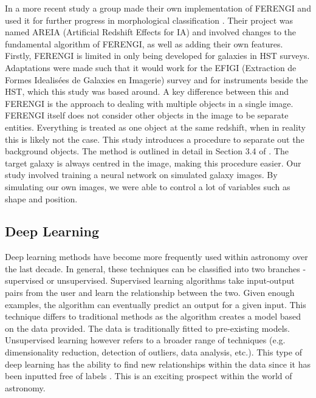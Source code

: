 \documentclass[fleqn,usenatbib]{mnras}
\begin{document}
In a more recent study a group made their own implementation of FERENGI and used it for further progress in morphological classification \citep{Ferreira2018}. Their project was named AREIA (Artificial Redshift Effects for IA) and involved changes to the fundamental algorithm of FERENGI, as well as adding their own features. Firstly, FERENGI is limited in only being developed for galaxies in HST surveys. Adaptations were made such that it would work for the EFIGI (Extraction de Formes Idealis\'ees de Galaxies en Imagerie) survey and for instruments beside the HST, which this study was based around. A key difference between this and FERENGI is the approach to dealing with multiple objects in a single image. FERENGI itself does not consider other objects in the image to be separate entities. Everything is treated as one object at the same redshift, when in reality this is likely not the case. This study introduces a procedure to separate out the background objects. The method is outlined in detail in Section 3.4 of \citet{Ferreira2018}. The target galaxy is always centred in the image, making this procedure easier.
Our study involved training a neural network on simulated galaxy images. By simulating our own images, we were able to control a lot of variables such as shape and position. 

\subsection{Deep Learning}
\label{sec:deep_learning}

Deep learning methods have become more frequently used within astronomy over the last decade. In general, these techniques can be classified into two branches - supervised or unsupervised. Supervised learning algorithms take input-output pairs from the user and learn the relationship between the two. Given enough examples, the algorithm can eventually predict an output for a given input. This technique differs to traditional methods as the algorithm creates a model based on the data provided. The data is traditionally fitted to pre-existing models. Unsupervised learning however refers to a broader range of techniques (e.g. dimensionality reduction, detection of outliers, data analysis, etc.). This type of deep learning has the ability to find new relationships within the data since it has been inputted free of labels \citep{Baron2019}. This is an exciting prospect within the world of astronomy.
\end{document}

